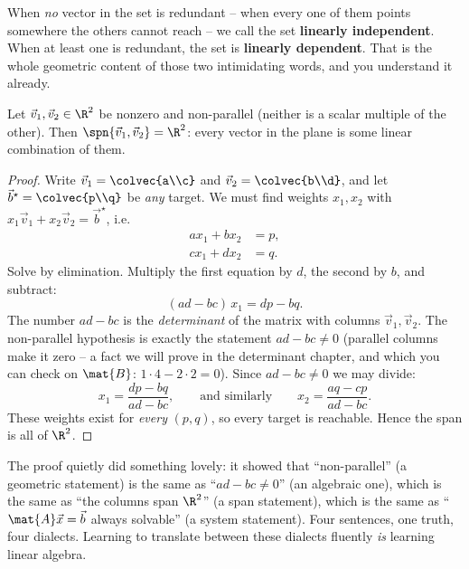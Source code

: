 When \emph{no} vector in the set is redundant -- when every one of them points somewhere the others cannot reach -- we call the set \textbf{linearly independent}. When at least one is redundant, the set is \textbf{linearly dependent}. That is the whole geometric content of those two intimidating words, and you understand it already.

\begin{theorem}\label{ch03:thm-span-r2}
Let $\vec{v}_1,\vec{v}_2 \in \R^2$ be nonzero and non-parallel (neither is a scalar multiple of the other). Then $\spn\{\vec{v}_1,\vec{v}_2\} = \R^2$: every vector in the plane is some linear combination of them.
\end{theorem}

\begin{proof}
Write $\vec{v}_1 = \colvec{a\\c}$ and $\vec{v}_2 = \colvec{b\\d}$, and let $\vec{b}^\star = \colvec{p\\q}$ be \emph{any} target. We must find weights $x_1,x_2$ with $x_1\vec{v}_1 + x_2\vec{v}_2 = \vec{b}^\star$, i.e.
\[
  \begin{aligned}
    a x_1 + b x_2 &= p,\\
    c x_1 + d x_2 &= q.
  \end{aligned}
\]
Solve by elimination. Multiply the first equation by $d$, the second by $b$, and subtract:
\[
  (ad - bc)\,x_1 = dp - bq.
\]
The number $ad-bc$ is the \emph{determinant} of the matrix with columns $\vec{v}_1,\vec{v}_2$. The non-parallel hypothesis is exactly the statement $ad-bc \neq 0$ (parallel columns make it zero -- a fact we will prove in the determinant chapter, and which you can check on $\mat{B}$: $1\cdot 4 - 2\cdot 2 = 0$). Since $ad-bc\neq 0$ we may divide:
\[
  x_1 = \frac{dp - bq}{ad-bc}, \qquad\text{and similarly}\qquad x_2 = \frac{aq - cp}{ad-bc}.
\]
These weights exist for \emph{every} $(p,q)$, so every target is reachable. Hence the span is all of $\R^2$.
\end{proof}

\begin{remark}
The proof quietly did something lovely: it showed that ``non-parallel'' (a geometric statement) is the same as ``$ad-bc\neq 0$'' (an algebraic one), which is the same as ``the columns span $\R^2$'' (a span statement), which is the same as ``$\mat{A}\vec{x}=\vec{b}$ always solvable'' (a system statement). Four sentences, one truth, four dialects. Learning to translate between these dialects fluently \emph{is} learning linear algebra.
\end{remark}

